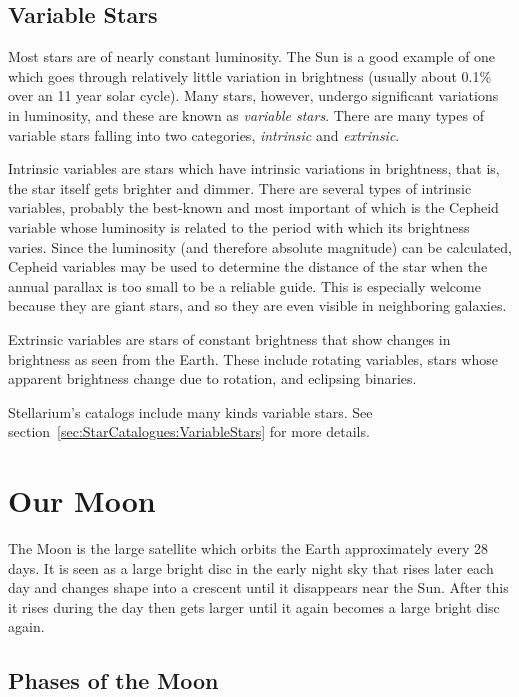 \subsection{Variable Stars}
\label{sec:Phenomena:variableStars}

Most stars are of nearly constant luminosity. The Sun is a good example
of one which goes through relatively little variation in brightness
(usually about 0.1\% over an 11 year solar cycle). Many stars, however,
undergo significant variations in luminosity, and these are known as
\emph{variable stars}. There are many types of variable stars falling
into two categories, \emph{intrinsic} and \emph{extrinsic}.

Intrinsic variables are stars which have intrinsic variations in
brightness, that is, the star itself gets brighter and dimmer. There
are several types of intrinsic variables, probably the best-known and
most important of which is the Cepheid variable whose luminosity is
related to the period with which its brightness varies. Since the
luminosity (and therefore absolute magnitude) can be calculated,
Cepheid variables may be used to determine the distance of the star
when the annual parallax is too small to be a reliable guide. This is
especially welcome because they are giant stars, and so they are even
visible in neighboring galaxies.

Extrinsic variables are stars of constant brightness that show changes
in brightness as seen from the Earth. These include rotating variables,
stars whose apparent brightness change due to rotation, and eclipsing
binaries.

Stellarium's catalogs include many kinds variable stars. 
See section~\ref{sec:StarCatalogues:VariableStars} for more details. 

\section{Our Moon}
\label{sec:Moon}

The Moon is the large satellite which orbits the Earth approximately
every 28 days. It is seen as a large bright disc in the early night sky
that rises later each day and changes shape into a crescent until it
disappears near the Sun. After this it rises during the day then gets
larger until it again becomes a large bright disc again.

\subsection{Phases of the Moon}
\label{sec:Moon:Phases}

